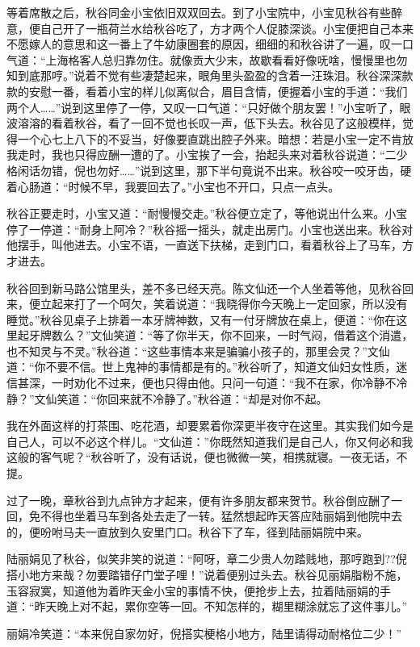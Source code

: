 \documentclass[12pt,UTF8]{ctexbook}
\begin{document}
{{{等着席散之后，秋谷同金小宝依旧双双回去。到了小宝院中，小宝见秋谷有些醉意，便自己开了一瓶荷兰水给秋谷吃了，方才两个人促膝深谈。小宝便把自己本来不愿嫁人的意思和这一番上了牛幼康圈套的原因，细细的和秋谷讲了一遍，叹一口气道：“上海格客人总归靠勿住。就像贡大少末，故歇看看好像呒啥，慢慢里也勿知到底那哼。”说着不觉有些凄楚起来，眼角里头盈盈的含着一汪珠泪。秋谷深深款款的安慰一番，看着小宝的样儿似离似合，眉目含情，便握着小宝的手道：“我们两个人……”说到这里停了一停，又叹一口气道：“只好做个朋友罢！”小宝听了，眼波溶溶的看着秋谷，看了一回不觉也长叹一声，低下头去。秋谷见了这般模样，觉得一个心七上八下的不妥当，好像要直跳出腔子外来。暗想：若是小宝一定不肯放我走时，我也只得应酬一遭的了。小宝挨了一会，抬起头来对着秋谷说道：“二少格闲话勿错，倪也勿好……”说到这里，那下半句竟说不出来。秋谷咬一咬牙齿，硬着心肠道：“时候不早，我要回去了。”小宝也不开口，只点一点头。

秋谷正要走时，小宝又道：“耐慢慢交走。”秋谷便立定了，等他说出什么来。小宝停了一停道：“耐身上阿冷？”秋谷摇一摇头，就走出房门。小宝也送出来。秋谷对他摆手，叫他进去。小宝不语，一直送下扶梯，走到门口，看着秋谷上了马车，方才进去。

秋谷回到新马路公馆里头，差不多已经天亮。陈文仙还一个人坐着等他，见秋谷回来，便立起来打了一个呵欠，笑着说道：“我晓得你今天晚上一定回家，所以没有睡觉。”秋谷见桌子上排着一本牙牌神数，又有一付牙牌放在桌上，便道：“你在这里起牙牌数么？”文仙笑道：“等了你半天，你不回来，一时气闷，借着这个消遣，也不知灵与不灵。”秋谷道：“这些事情本来是骗骗小孩子的，那里会灵？”文仙道：“你不要不信。世上鬼神的事情都是有的。”秋谷听了，知道文仙妇女性质，迷信甚深，一时劝化不过来，便也只得由他。只问一句道：“我不在家，你冷静不冷静？”文仙笑道：“你回来就不冷静了。”秋谷道：“却是对你不起。

我在外面这样的打茶围、吃花酒，却要累着你深更半夜守在这里。其实我们如今是自己人，可以不必这个样儿。“文仙道：”你既然知道我们是自己人，你又何必和我这般的客气呢？“秋谷听了，没有话说，便也微微一笑，相携就寝。一夜无话，不提。

过了一晚，章秋谷到九点钟方才起来，便有许多朋友都来贺节。秋谷倒应酬了一回，免不得也坐着马车到各处去走了一转。猛然想起昨天答应陆丽娟到他院中去的，便吩咐马夫一直放到久安里门口。秋谷下了车，径到陆丽娟院中来。

陆丽娟见了秋谷，似笑非笑的说道：“阿呀，章二少贵人勿踏贱地，那哼跑到??倪搭小地方来哉？勿要踏错仔门堂子哩！”说着便别过头去。秋谷见丽娟脂粉不施，玉容寂寞，知道他为着昨天金小宝的事情不快，便抢步上去，拉着陆丽娟的手道：“昨天晚上对不起，累你空等一回。不知怎样的，糊里糊涂就忘了这件事儿。”

丽娟冷笑道：“本来倪自家勿好，倪搭实梗格小地方，陆里请得动耐格位二少！”

}}}
\end{document}
